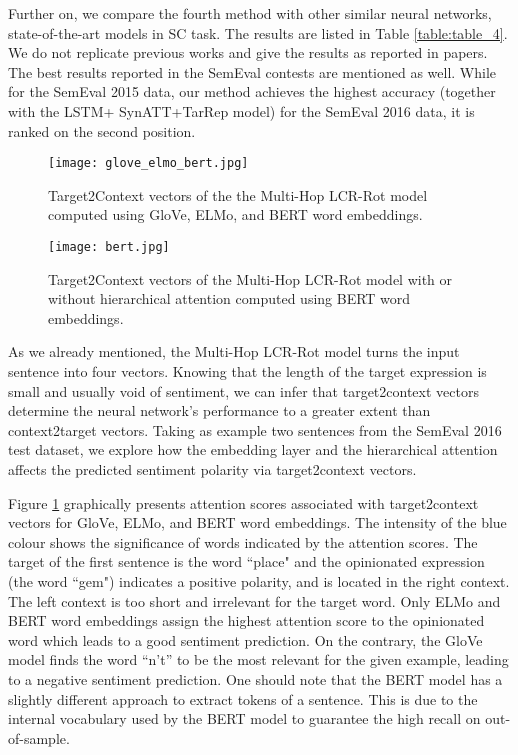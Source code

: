 \documentclass[hidelinks]{llncs}
\begin{document}
Further on, we compare the fourth method with other similar neural networks, state-of-the-art models in SC task. The results are listed in Table \ref{table:table_4}. We do not replicate previous works and give the results as reported in papers. The best results reported in the SemEval contests are mentioned as well. While for the SemEval 2015 data, our method achieves the highest accuracy (together with the LSTM+ SynATT+TarRep \cite{he2018effective} model) for the SemEval 2016 data, it is ranked on the second position.

\begin{figure}[!b]
\vspace{-0.8cm}
\begin{center}
\texttt{[image: glove\_elmo\_bert.jpg]}\end{center}
\caption{Target2Context vectors of the the Multi-Hop LCR-Rot model computed using GloVe, ELMo, and BERT word embeddings.} 	
\label{fig:figure_2}
\end{figure} 

\begin{figure}[t]
\centering
\texttt{[image: bert.jpg]}\caption{Target2Context vectors of the Multi-Hop LCR-Rot model with or without hierarchical attention computed using BERT word embeddings.} 	
\label{fig:figure_3}
\vspace{-0.5cm}
\end{figure} 

As we already mentioned, the Multi-Hop LCR-Rot model turns the input sentence into four vectors. Knowing that the length of the target expression is small and usually void of sentiment, we can infer that target2context vectors determine the neural network's performance to a greater extent than context2target vectors. Taking as example two sentences from the SemEval 2016 test dataset, we explore how the embedding layer and the hierarchical attention affects the predicted sentiment polarity via target2context vectors. 

Figure \ref{fig:figure_2} graphically presents attention scores associated with target2context vectors for GloVe, ELMo, and BERT word embeddings. The intensity of the blue colour shows the significance of words indicated by the attention scores. The target of the first sentence is the word ``place" and the opinionated expression (the word ``gem") indicates a positive polarity, and is located in the right context. The left context is too short and irrelevant for the target word. Only ELMo and BERT word embeddings assign the highest attention score to the opinionated word which leads to a good sentiment prediction. On the contrary, the GloVe model finds the word ``n't'' to be the most relevant for the given example, leading to a negative sentiment prediction. One should note that the BERT model has a slightly different approach to extract tokens of a sentence. This is due to the internal vocabulary used by the BERT model to guarantee the high recall on out-of-sample.
\end{document}

